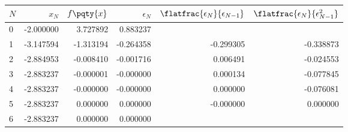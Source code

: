 \begin{tabular}{lrrrrr}
\toprule
\(N\) & \(x_N\) & \(f\pqty{x}\) & \(\epsilon_N\) & \(\flatfrac{\epsilon_N}{\epsilon_{N - 1}}\) & \(\flatfrac{\epsilon_N}{\epsilon_{N - 1}^2}\) \\
\midrule
0 & -2.000000 & 3.727892 & 0.883237 & & \\
1 & -3.147594 & -1.313194 & -0.264358 & -0.299305 & -0.338873 \\
2 & -2.884953 & -0.008410 & -0.001716 & 0.006491 & -0.024553 \\
3 & -2.883237 & -0.000001 & -0.000000 & 0.000134 & -0.077845 \\
4 & -2.883237 & -0.000000 & -0.000000 & 0.000000 & -0.076081 \\
\midrule
5 & -2.883237 & 0.000000 & 0.000000 & -0.000000 & 0.000000 \\
6 & -2.883237 & 0.000000 & 0.000000 &  & \\
\bottomrule
\end{tabular}
